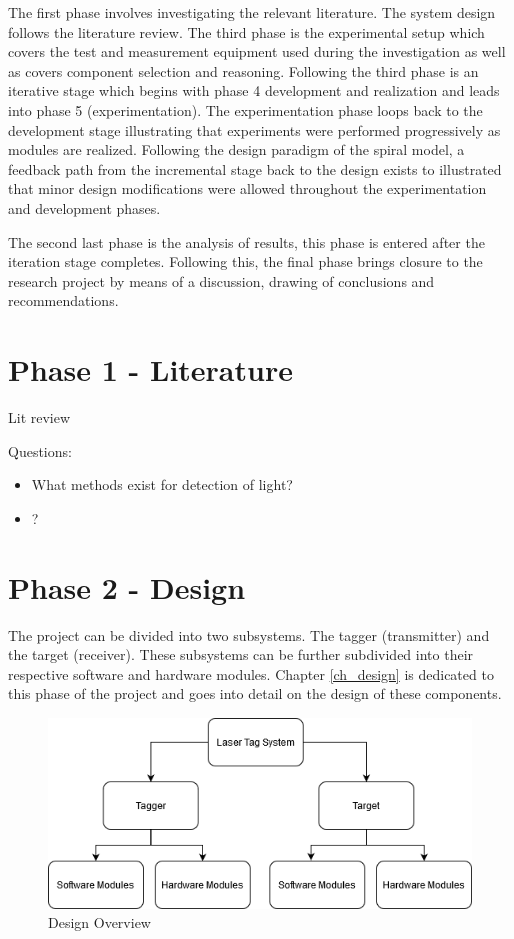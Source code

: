 The first phase involves investigating the relevant literature. The system design follows the literature review. The third phase is the experimental setup which covers the test and measurement equipment used during the investigation as well as covers component selection and reasoning. Following the third phase is an iterative stage which begins with phase 4 development and realization and leads into phase 5 (experimentation). The experimentation phase loops back to the development stage illustrating that experiments were performed progressively as modules are realized. Following the design paradigm of the spiral model, a feedback path from the incremental stage back to the design exists to illustrated that minor design modifications were allowed throughout the experimentation and development phases. 

The second last phase is the analysis of results, this phase is entered after the iteration stage completes. Following this, the final phase brings closure to the research project by means of a discussion, drawing of conclusions and recommendations.

\section{Phase 1 - Literature}

Lit review

Questions:

\begin{itemize}
	\item What methods exist for detection of light?
	\item ?
\end{itemize}



\section{Phase 2 - Design}

The project can be divided into two subsystems. The tagger (transmitter) and the target (receiver). These subsystems can be further subdivided into their respective software and hardware modules. Chapter \ref{ch_design} is dedicated to this phase of the project and goes into detail on the design of these components.

\begin{figure}[H]
	\centering
	\includegraphics[width=0.7\linewidth]{figures/methodology/design_overview}
	\caption{Design Overview}
	\label{fig:designoverview}
\end{figure}

